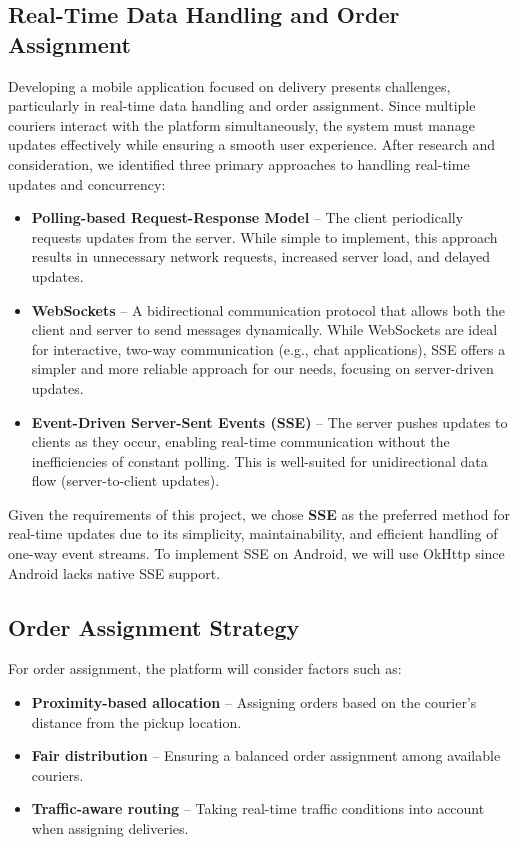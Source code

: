 \documentclass[a4paper,twoside,11pt]{article}
\begin{document}
\subsection{Real-Time Data Handling and Order Assignment}  

Developing a mobile application focused on delivery presents challenges, particularly in real-time data handling and order assignment. Since multiple couriers interact with the platform simultaneously, the system must manage updates effectively while ensuring a smooth user experience. After research and consideration, we identified three primary approaches to handling real-time updates and concurrency:

\begin{itemize}
    \item \textbf{Polling-based Request-Response Model} – The client periodically requests updates from the server. While simple to implement, this approach results in unnecessary network requests, increased server load, and delayed updates.
    \item \textbf{WebSockets} – A bidirectional communication protocol that allows both the client and server to send messages dynamically. While WebSockets are ideal for interactive, two-way communication (e.g., chat applications), SSE offers a simpler and more reliable approach for our needs, focusing on server-driven updates.
    \item \textbf{Event-Driven Server-Sent Events (SSE)} – The server pushes updates to clients as they occur, enabling real-time communication without the inefficiencies of constant polling. This is well-suited for unidirectional data flow (server-to-client updates).
\end{itemize}

Given the requirements of this project, we chose \textbf{SSE} as the preferred method for real-time updates due to its simplicity, maintainability, and efficient handling of one-way event streams. To implement SSE on Android, we will use OkHttp since Android lacks native SSE support.

\subsection{Order Assignment Strategy}  

For order assignment, the platform will consider factors such as:

\begin{itemize}
    \item \textbf{Proximity-based allocation} – Assigning orders based on the courier’s distance from the pickup location.
    \item \textbf{Fair distribution} – Ensuring a balanced order assignment among available couriers.
    \item \textbf{Traffic-aware routing} – Taking real-time traffic conditions into account when assigning deliveries.
\end{itemize}
\end{document}
